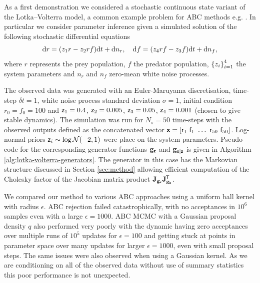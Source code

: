 As a first demonstration we considered a stochastic continuous state variant of the Lotka--Volterra model, a common example problem for \ac{ABC} methods e.g. \citep{meeds2015optimization}. In particular we consider parameter inference given a simulated solution of the following stochastic differential equations
\begin{equation}\label{eq:lotka-volterra}
    \dr r = \lpa z_1 r - z_2 r f \rpa \dr t + \dr n_r,
    \quad
    \dr f = \lpa z_4 r f -z_3 f \rpa \dr t + \dr n_f,
\end{equation}
where $r$ represents the prey population, $f$ the predator population, $\fset{z_i}_{i=1}^4$ the system parameters and $n_r$ and $n_f$ zero-mean white noise processes.

The observed data was generated with an Euler-Maruyama discretisation, time-step $\delta t = 1$, white noise process standard deviation $\sigma = 1$, initial condition $r_0 = f_0 = 100$ and $\mathsf{z}_1=0.4$, $\mathsf{z}_2 = 0.005$,  $\mathsf{z}_3=0.05$, $\mathsf{z}_4=0.001$ (chosen to give stable dynamics). The simulation was run for $N_s = 50$ time-steps with the observed outputs defined as the concatenated vector $\rvct{x} = { \lsb \rvar{r}_1 ~ \rvar{f}_1 ~ \dots ~ \rvar{r}_{50} ~ \rvar{f}_{50} \rsb}$. Log-normal priors $\rvar{z}_i \sim \log \nrm{-2, 1}$ were place on the system parameters. Pseudo-code for the corresponding generator functions ${\mathbf{g}}_{\boldsymbol{\mathsf{z}}}$ and ${\mathbf{g}}_{\boldsymbol{\mathsf{x}}|\boldsymbol{\mathsf{z}}}$ is given in Algorithm \ref{alg:lotka-volterra-generators}. The generator in this case has the Markovian structure discussed in Section \ref{sec:method} allowing efficient computation of the Cholesky factor of the Jacobian matrix product $\mathbf{J}_{{\mathbf{g}}_{\boldsymbol{\mathsf{x}}}}\mathbf{J}_{{\mathbf{g}}_{\boldsymbol{\mathsf{x}}}}^{\mkern-1.5mu\mathsf{T}}$.

We compared our method to various \ac{ABC} approaches using a uniform ball kernel with radius $\epsilon$. \ac{ABC} rejection failed catastrophically, with no acceptances in $10^6$ samples even with a large $\epsilon = 1000$. \ac{ABC} \ac{MCMC} with a Gaussian proposal density $q$ also performed very poorly with the dynamic having zero acceptances over multiple runs of $10^5$ updates for $\epsilon=100$ and getting stuck at points in parameter space over many updates for larger $\epsilon=1000$, even with small proposal steps. The same issues were also observed when using a Gaussian kernel. As we are conditioning on all of the observed data without use of summary statistics this poor performance is not unexpected.

